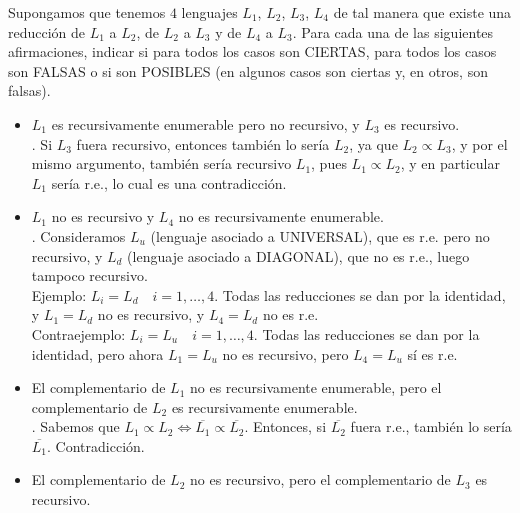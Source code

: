 \begin{ejercicio}
    Supongamos que tenemos $4$ lenguajes $L_1$, $L_2$, $L_3$, $L_4$ de tal manera que existe una reducción de $L_1$ a $L_2$, de $L_2$ a $L_3$ y de $L_4$ a $L_3$. Para cada una de las siguientes afirmaciones,
    indicar si para todos los casos son CIERTAS, para todos los casos son FALSAS o si son POSIBLES (en algunos casos son ciertas y, en otros, son falsas).
    \begin{itemize}
        \item[a)] $L_1$ es recursivamente enumerable pero no recursivo, y $L_3$ es recursivo. \\
        
        . Si $L_3$ fuera recursivo, entonces también lo sería $L_2$, ya que $L_2 \propto L_3$, y por el 
        mismo argumento, también sería recursivo $L_1$, pues $L_1 \propto L_2$, y en particular $L_1$ sería r.e., lo cual es una contradicción.

        \item[b)] $L_1$ no es recursivo y $L_4$ no es recursivamente enumerable. \\
        
        . Consideramos $L_u$ (lenguaje asociado a UNIVERSAL), que es r.e. pero no recursivo, 
        y $L_d$ (lenguaje asociado a DIAGONAL), que no es r.e., luego tampoco recursivo. \\

        Ejemplo: $L_i = L_d \quad i = 1, \ldots, 4$. Todas las reducciones se dan por la identidad, y 
        $L_1 = L_d$ no es recursivo, y $L_4 = L_d$ no es r.e. \\

        Contraejemplo: $L_i = L_u \quad i = 1, \ldots, 4$. Todas las reducciones se dan por la identidad, pero ahora
        $L_1 = L_u$ no es recursivo, pero $L_4 = L_u$ sí es r.e. 

        \item[c)] El complementario de $L_1$ no es recursivamente enumerable, pero el complementario de $L_2$ es 
        recursivamente enumerable. \\

        . Sabemos que $L_1 \propto L_2 \iff \overline{L_1} \propto \overline{L_2}$. Entonces,
        si $\overline{L_2}$ fuera r.e., también lo sería $\overline{L_1}$. Contradicción.  

        \item[d)] El complementario de $L_2$ no es recursivo, pero el complementario de $L_3$ es recursivo. \\
        

\end{itemize}
\end{ejercicio}
